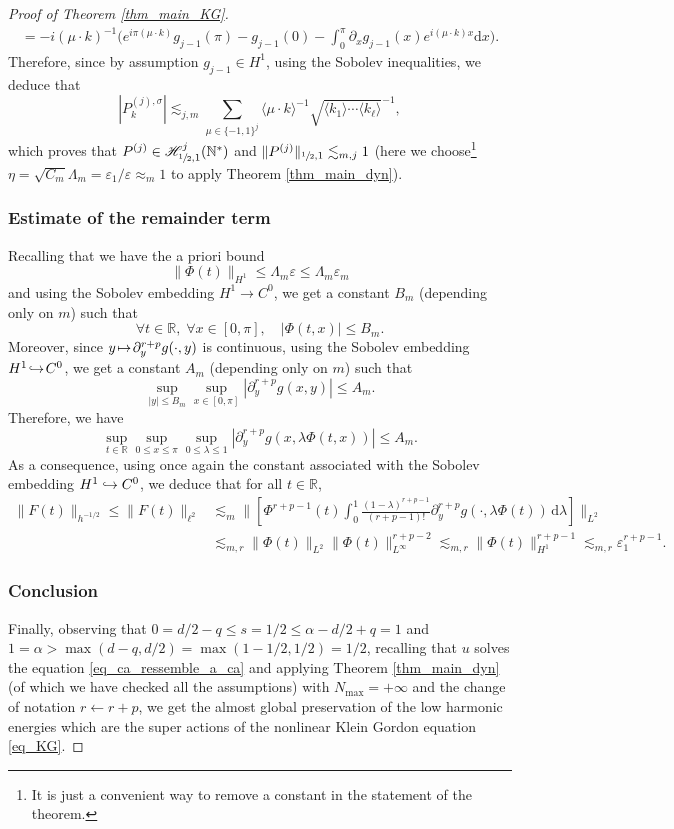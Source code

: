 \documentclass[JEP,XML,SOM,Unicode,NoEqCountersInSection,published]{cedram}
\newcommand\mto{\mathchoice{\longmapsto}{\mapsto}{\mapsto}{\mapsto}}
\newcommand\hto{\mathrel{\lhook\joinrel\to}}
\theoremstyle{definition}
\begin{document}
\begin{proof}[Proof of Theorem \ref{thm_main_KG}]
\begin{multline*}
=-i (\mu \cdot k)^{-1} \biggl(e^{i\pi(\mu \cdot k) } g_{j-1}(\pi) - g_{j-1}(0) - \int_0^\pi \partial_x g_{j-1}(x) e^{i(\mu \cdot k) x} \mathrm{d}x \biggr).
\end{multline*}
Therefore, since by assumption $g_{j-1} \in H^1$, using the Sobolev inequalities, we deduce that
\[
|P^{(j),\sigma}_k| \lesssim_{j,m} \sum_{\mu \in \{-1,1\}^j} \langle \mu \cdot k \rangle^{-1} \sqrt{ \langle k_1 \rangle \cdots \langle k_\ell \rangle }^{-1},
\]
which proves that $P^{(j)} \in \mathscr{H}_{\sfrac12,1}^j(\mathbb{N}^*)$ and $\| P^{(j)} \|_{\sfrac12,1} \lesssim_{m,j} 1$ (here we choose\footnote{It is just a convenient way to remove a constant in the statement of the theorem.} $\eta = \sqrt{C_m} \Lambda_m= \varepsilon_1/\varepsilon\approx_m 1$ to apply Theorem \ref{thm_main_dyn}).

\subsubsection*{Estimate of the remainder term}
Recalling that we have the a priori bound
\[
\| \Phi(t) \|_{H^1} \leq \Lambda_m \varepsilon \leq \Lambda_m \varepsilon_m
\]
and using the Sobolev embedding $H^1 \to C^0$, we get a constant $B_m$ (depending only on $m$) such that
\[
\forall t\in \mathbb{R},\; \forall x\in [0,\pi], \quad | \Phi(t,x) | \leq B_m.
\]
Moreover, since $y\!\mto\! \partial_{y}^{r+p} g(\cdot,y)$ is continuous, using the Sobolev embedding \hbox{$H^1\!\hto\!C^0$}, we get a constant $A_m$ (depending only on $m$) such that
\[
\sup_{|y|\leq B_m} \sup_{x\in [0,\pi]} | \partial_{y}^{r+p} g(x,y)| \leq A_m.
\]
Therefore, we have
\[
\sup_{t\in \mathbb{R}} \sup_{0 \leq x \leq \pi} \sup_{0 \leq \lambda \leq 1} |\partial_{y}^{r+p} g(x,\lambda \Phi(t,x))| \leq A_m.
\]
As a consequence, using once again the constant associated with the Sobolev embedding $H^1 \hto C^0$, we deduce that for all $t\in \mathbb{R}$,
\begin{align*}
\| F(t) \|_{h^{-1/2}} \leq \| F(t) \|_{\ell^2} &\lesssim_m \biggl\| \left[\Phi^{r+p-1}(t) \int_0^1 \frac{(1-\lambda)^{r+p-1}}{(r+p-1)!} \partial_{y}^{r+p} g(\cdot,\lambda \Phi(t)) \, \mathrm{d}\lambda \right] \biggr\|_{L^2} \\
&\lesssim_{m,r} \| \Phi(t) \|_{L^2} \| \Phi(t) \|_{L^\infty}^{r+p-2} \lesssim_{m,r} \| \Phi(t) \|_{H^1}^{r+p-1} \lesssim_{m,r} \varepsilon_1^{r+p-1}.
\end{align*}

\subsubsection*{Conclusion}
Finally, observing that $0=d/2-q \leq s=1/2 \leq \alpha - d/2 +q =1 $ and $1=\alpha > \max(d-q,d/2) =\max(1-1/2,1/2)=1/2$, recalling that $u$ solves the equation \eqref{eq_ca_ressemble_a_ca} and applying Theorem \ref{thm_main_dyn} (of which we have checked all the assumptions) with $N_{\max}=+\infty$ and the change of notation $r\leftarrow r+p$, we get the almost global preservation of the low harmonic energies which are the super actions of the nonlinear Klein Gordon equation \eqref{eq_KG}.
\end{proof}
\end{document}
